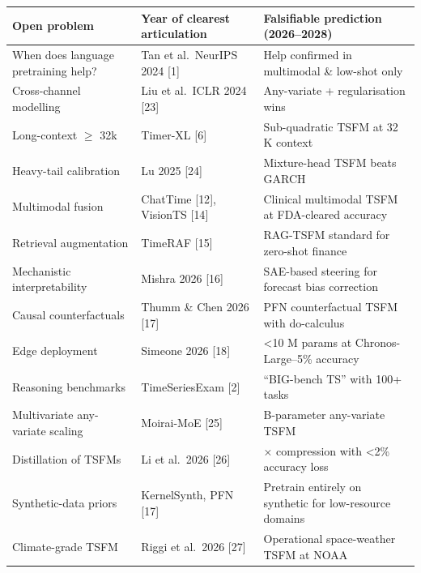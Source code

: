 {\def\LTcaptype{none} %
\begin{longtable}[]{@{}
  >{\raggedright\arraybackslash}p{}
  >{\raggedright\arraybackslash}p{}
  >{\raggedright\arraybackslash}p{}@{}}
\toprule\noalign{}
\begin{minipage}[b]{\linewidth}\raggedright
Open problem
\end{minipage} & \begin{minipage}[b]{\linewidth}\raggedright
Year of clearest articulation
\end{minipage} & \begin{minipage}[b]{\linewidth}\raggedright
Falsifiable prediction (2026--2028)
\end{minipage} \\
\midrule\noalign{}
\endhead
\bottomrule\noalign{}
\endlastfoot
When does language pretraining help? & Tan et al.~NeurIPS 2024 {[}1{]} & Help confirmed in multimodal \& low-shot only \\
Cross-channel modelling & Liu et al.~ICLR 2024 {[}23{]} & Any-variate + regularisation wins \\
Long-context \(\geq\) 32k & Timer-XL {[}6{]} & Sub-quadratic TSFM at 32 K context \\
Heavy-tail calibration & Lu 2025 {[}24{]} & Mixture-head TSFM beats GARCH \\
Multimodal fusion & ChatTime {[}12{]}, VisionTS {[}14{]} & Clinical multimodal TSFM at FDA-cleared accuracy \\
Retrieval augmentation & TimeRAF {[}15{]} & RAG-TSFM standard for zero-shot finance \\
Mechanistic interpretability & Mishra 2026 {[}16{]} & SAE-based steering for forecast bias correction \\
Causal counterfactuals & Thumm \& Chen 2026 {[}17{]} & PFN counterfactual TSFM with do-calculus \\
Edge deployment & Simeone 2026 {[}18{]} & \textless10 M params at Chronos-Large--5\% accuracy \\
Reasoning benchmarks & TimeSeriesExam {[}2{]} & ``BIG-bench TS'' with 100+ tasks \\
Multivariate any-variate scaling & Moirai-MoE {[}25{]} & 10 B-parameter any-variate TSFM \\
Distillation of TSFMs & Li et al.~2026 {[}26{]} & 4× compression with \textless2\% accuracy loss \\
Synthetic-data priors & KernelSynth, PFN {[}17{]} & Pretrain entirely on synthetic for low-resource domains \\
Climate-grade TSFM & Riggi et al.~2026 {[}27{]} & Operational space-weather TSFM at NOAA \\
\end{longtable}
}

